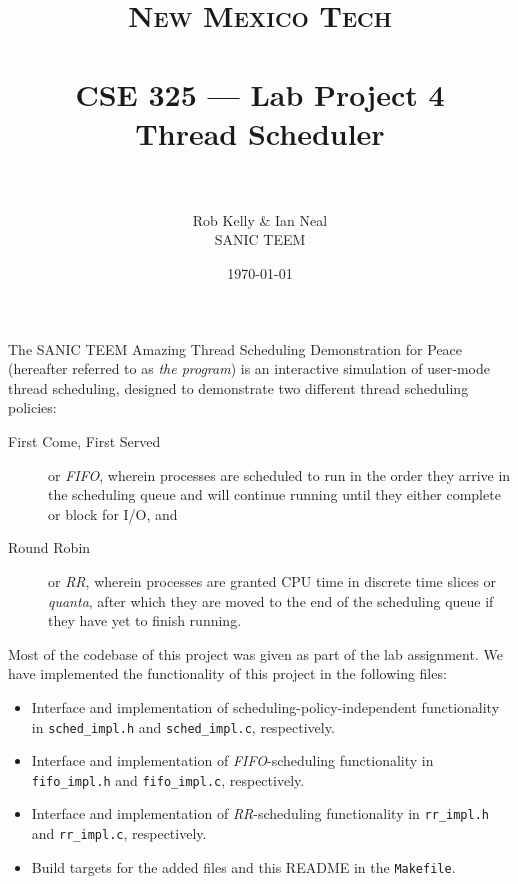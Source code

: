 \documentclass[paper=a4, fontsize=11pt]{scrartcl}
\title{
  \normalfont \normalsize 
  \textsc{New Mexico Tech} \\ [25pt]
  \horrule{0.5pt} \\[0.4cm]
  \huge CSE 325 --- Lab Project 4 \\ Thread Scheduler \\
  \horrule{2pt} \\[0.5cm]
}
\author{Rob Kelly \& Ian Neal \\ SANIC TEEM}
\date{\normalsize\today}
\begin{document}
\maketitle

The SANIC TEEM Amazing Thread Scheduling Demonstration for Peace (hereafter referred to as \textit{the program}) is an interactive simulation of user-mode thread scheduling, designed to demonstrate two different thread scheduling policies:

\begin{description}
  \item[First Come, First Served] or \textit{FIFO}, wherein processes are scheduled to run in the order they arrive in the scheduling queue and will continue running until they either complete or block for I/O, and

  \item[Round Robin] or \textit{RR}, wherein processes are granted CPU time in discrete time slices or \textit{quanta}, after which they are moved to the end of the scheduling queue if they have yet to finish running.
\end{description}

Most of the codebase of this project was given as part of the lab assignment. We have implemented the functionality of this project in the following files:

\begin{itemize}
  \item Interface and implementation of scheduling-policy-independent functionality in \texttt{sched\_impl.h} and \texttt{sched\_impl.c}, respectively.

  \item Interface and implementation of \textit{FIFO}-scheduling functionality in \texttt{fifo\_impl.h} and \texttt{fifo\_impl.c}, respectively.

  \item Interface and implementation of \textit{RR}-scheduling functionality in \texttt{rr\_impl.h} and \texttt{rr\_impl.c}, respectively.

  \item Build targets for the added files and this README in the \texttt{Makefile}.
\end{itemize}

\end{document}
